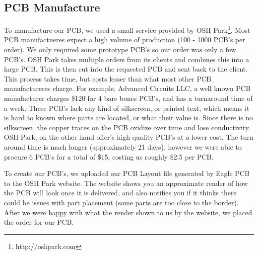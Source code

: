 \subsection{PCB Manufacture}
To manufacture our PCB, we used a small service provided by OSH Park\footnote{http://oshpark.com}.
Most PCB manufactueres expect a high volume of production (100 - 1000 PCB's per order).
We only required some prototype PCB's so our order was only a few PCB's.
OSH Park takes multiple orders from its clients and combines this into a large PCB.
This is then cut into the requested PCB and sent back to the client.
This process takes time, but costs lesser than what most other PCB manufactureres charge.
For example,
Advanced Circuits LLC,
a well known PCB manufacturer charges \$120 for 4 bare bones PCB's,
and has a turnaround time of a week.
These PCB's lack any kind of silkscreen,
or printed text,
which means it is hard to known where parts are located,
or what their value is.
Since there is no silkscreen,
the copper traces on the PCB oxidize over time and lose conductivity.
OSH Park,
on the other hand offer's high quality PCB's at a lower cost.
The turn around time is much longer (approximately 21 days),
however we were able to procure 6 PCB's for a total of \$15,
costing us roughly \$2.5 per PCB.

To create our PCB's, we uploaded our PCB Layout file generated by Eagle PCB to the OSH Park website.
The website shows you an approximate render of how the PCB will look once it is delivered,
and also notifies you if it thinks there could be issues with part placement (some parts are too close to the border).
After we were happy with what the render shown to us by the website,
we placed the order for our PCB.

